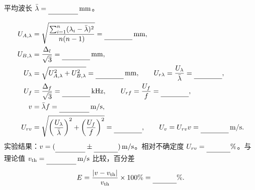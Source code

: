 \documentclass[UTF8,a4paper,10pt,fontset=fandol]{ctexart}
\makeatletter
\newcommand{\Field}[2][1.7cm]{%
  \underline{\makebox[#1][c]{%
    \ifcsname expdata@#2\endcsname\csname expdata@#2\endcsname\else\strut\fi}}}
\newcommand{\MathField}[2][1.7cm]{\mbox{\Field[#1]{#2}}}
\makeatother
\begin{document}
平均波长 $\bar\lambda=\MathField[1.5cm]{phase_lambda_avg}\,\mathrm{mm}$。\par
\begin{align*}
U_{A,\lambda}&=\sqrt{\frac{\sum_{i=1}^{n}(\lambda_i-\bar\lambda)^2}{n(n-1)}}
  =\MathField[1.4cm]{phase_u_a}\,\mathrm{mm},\\
U_{B,\lambda}&=\frac{\Delta_l}{\sqrt3}=\MathField[1.4cm]{phase_u_b}\,\mathrm{mm},\\
U_\lambda&=\sqrt{U_{A,\lambda}^2+U_{B,\lambda}^2}
  =\MathField[1.4cm]{phase_u_lambda}\,\mathrm{mm},\qquad
U_{r\lambda}=\frac{U_\lambda}{\bar\lambda}
  =\MathField[1.4cm]{phase_u_r_lambda},\\
U_f&=\frac{\Delta_f}{\sqrt3}=\MathField[1.4cm]{phase_u_f}\,\mathrm{kHz},\qquad
U_{rf}=\frac{U_f}{f}=\MathField[1.4cm]{phase_u_r_f},\\
v&=\bar\lambda f=\MathField[1.5cm]{phase_speed}\,\mathrm{m/s},\\
U_{rv}&=\sqrt{\left(\frac{U_\lambda}{\bar\lambda}\right)^2+
              \left(\frac{U_f}{f}\right)^2}
  =\MathField[1.4cm]{phase_u_r_v},\qquad
U_v=U_{rv}v=\MathField[1.4cm]{phase_u_v}\,\mathrm{m/s}.
\end{align*}
实验结果：$v=(\MathField[1.5cm]{phase_speed_result}\pm\MathField[1.2cm]{phase_u_v_result})\,\mathrm{m/s}$。相对不确定度 $U_{rv}=\MathField[1.2cm]{phase_u_r_v_percent}\%$。与理论值 $v_{\mathrm{th}}=\MathField[1.5cm]{phase_speed_theory}\,\mathrm{m/s}$ 比较，百分差
\begin{equation*}
E=\frac{|v-v_{\mathrm{th}}|}{v_{\mathrm{th}}}\times100\%
 =\MathField[1.2cm]{phase_error_percent}\%.
\end{equation*}
\end{document}
